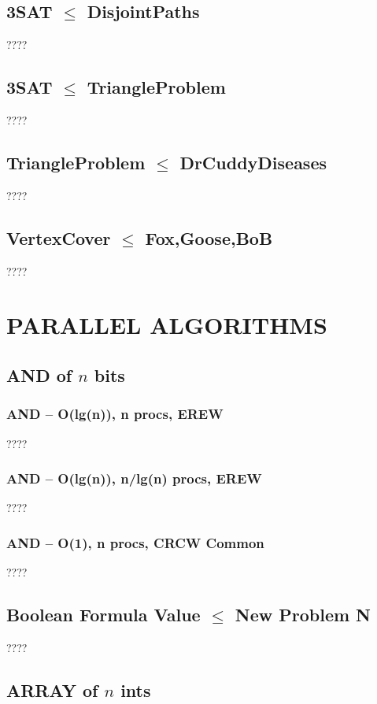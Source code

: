 \documentclass[12pt]{article}
\providecommand{\reducible}[2]{
  \textbf{#1} $\leq$ \textbf{#2}
}
\begin{document}
\subsection{\reducible{3SAT}{DisjointPaths}}
????


\subsection{\reducible{3SAT}{TriangleProblem}}
????



\subsection{\reducible{TriangleProblem}{DrCuddyDiseases}}
????


\subsection{\reducible{VertexCover}{Fox,Goose,BoB}}
????





\section{PARALLEL ALGORITHMS}
\subsection{AND of $n$ bits}
\subsubsection{AND -- O(lg(n)), n procs, EREW}
????
\subsubsection{AND -- O(lg(n)), n/lg(n) procs, EREW}
????
\subsubsection{AND -- O(1), n procs, CRCW Common}
????


\subsection{\reducible{Boolean Formula Value}{New Problem N}}
????


\subsection{ARRAY of $n$ ints}
\end{document}
